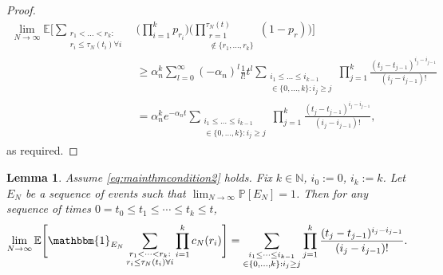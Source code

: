 \documentclass[12pt,authoryear]{article}
\newtheorem{lemma}{Lemma}
\theoremstyle{definition}
\newcommand{\Prob}{\mathbb{P}}
\newcommand{\E}{\mathbb{E}}
\newcommand{\1}[1]{\mathbbm{1}_{#1}}
\begin{document}
\begin{proof}
\begin{align*}
\lim_{N\to\infty} \E \Bigg[ 
        \sum_{\substack{r_1 <\dots< r_k :\\ r_i \leq \tau_N(t_i) \forall i}}
        &\Bigg( \prod_{i=1}^k p_{r_i} \Bigg)
        \Bigg( \prod_{\substack{r=1 \\ \notin \{r_1,\dots,r_k\} }}^{\tau_N(t)} 
        (1-p_r) \Bigg) \Bigg] \\
&\geq \alpha_n^k
        \sum_{l=0}^{\infty} (-\alpha_n)^l
        \frac{1}{l!} t^l
        \sum_{\substack{i_1\leq \dots\leq i_{k-1}\\ \in \{0,\dots,k\} :
        i_j \geq j}}
        \prod_{j=1}^k \frac{(t_j - t_{j-1})^{i_j - i_{j-1}}}{(i_j - i_{j-1})! } \\
&= \alpha_n^k e^{-\alpha_n t} 
        \sum_{\substack{i_1\leq \dots\leq i_{k-1}\\ \in \{0,\dots,k\} :
        i_j \geq j}}
        \prod_{j=1}^k \frac{(t_j - t_{j-1})^{i_j - i_{j-1}}}{(i_j - i_{j-1})! },
\end{align*}
as required.
\end{proof}





\begin{lemma}\label{thm:induction_sumprodcN}
Assume \eqref{eq:mainthmcondition2} holds.
Fix $k \in \mathbb{N}$, $i_0:=0$, $i_k:=k$. 
Let $E_N$ be a sequence of events such that 
$\lim_{N\to\infty} \Prob[E_N] =1$. 
Then for any sequence of times 
$0 = t_0 \leq t_1 \leq \cdots \leq t_k \leq t$,
\begin{equation*}
\lim_{N\to\infty} \E \Bigg[ \1{E_N} 
        \sum_{\substack{r_1<\dots<r_k :\\ r_i\leq \tau_N(t_i) \forall i}}
        \prod_{i=1}^k c_N(r_i) \Bigg] 
= \sum_{\substack{i_1\leq \dots\leq i_{k-1}\\ \in \{0,\dots,k\} :
        i_j \geq j}}
        \prod_{j=1}^k \frac{(t_j - t_{j-1})^{i_j - i_{j-1}}}{(i_j - i_{j-1})! } .
\end{equation*}
\end{lemma}
\end{document}
